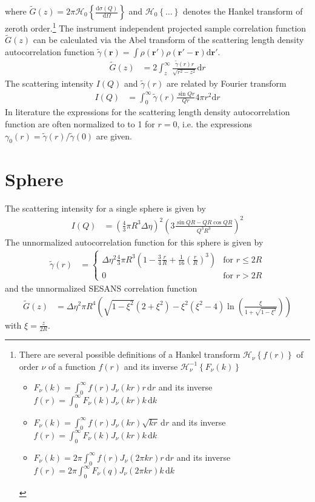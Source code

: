 where $\tilde{G}(z)=2\pi\mathcal{H}_0\left\{\frac{\mathrm{d}\sigma(Q)}{\mathrm{d}\Omega}\right\}$ and $\mathcal{H}_0\left\{\ldots\right\}$ denotes the Hankel transform of zeroth order.\footnote{
There are several possible definitions of a Hankel transform $\mathcal{H}_\nu\left\{f(r)\right\}$ of order $\nu$ of a function $f(r)$ and its inverse $\mathcal{H}_\nu^{-1}\left\{F_\nu(k)\right\}$
\begin{itemize}
\item $F_\nu(k) = \int_0^\infty f(r) J_\nu(kr) r \,\mathrm{d}r$ and its inverse $f(r)=\int_0^\infty F_\nu(k)J_\nu(kr) k \,\mathrm{d}k$
\item $F_\nu(k) = \int_0^\infty f(r) J_\nu(kr) \sqrt{kr} \,\mathrm{d}r$ and its inverse $f(r)=\int_0^\infty F_\nu(k)J_\nu(kr) k \, \mathrm{d}k$
\item $F_\nu(k) = 2\pi \int_0^\infty f(r) J_\nu(2\pi kr) r \,\mathrm{d}r$ and its inverse $f(r)=2\pi \int_0^\infty F_\nu(q)J_\nu(2\pi kr) k \,\mathrm{d}k$
\end{itemize}
}
The instrument independent projected sample correlation function $\tilde{G}(z)$ can be calculated via the Abel transform of the scattering length density autocorrelation function $\tilde{\gamma}(\mathbf{r})=\int \rho(\mathbf{r'})\rho(\mathbf{r'-r})\mathrm{d}\mathbf{r'}$.
\begin{align}
\tilde{G}(z) &= 2 \int_z^\infty \frac{\tilde{\gamma}(r) r}{\sqrt{r^2-z^2}} \mathrm{d}r
\end{align}
The scattering intensity $I(Q)$ and  $\tilde{\gamma}(r)$ are related by Fourier transform
\begin{align}
I(Q) &= \int_0^\infty \tilde{\gamma}(r) \frac{\sin Qr}{Qr}4\pi r^2\mathrm{d}r
\end{align}
In literature the expressions for the scattering length density autocorrelation function are often normalized to to 1 for $r=0$, i.e. the expressions $\gamma_0(r)=\tilde{\gamma}(r)/\tilde{\gamma}(0)$ are given.

\section{Sphere}
The scattering intensity for a single sphere is given by
\begin{align}
I(Q) &= \left(\frac{4}{3}\pi R^3 \Delta\eta\right)^2 \left(3\frac{\sin QR-QR\cos QR}{Q^3R^3}\right)^2
\end{align}
The unnormalized autocorrelation function for this sphere is given by
\begin{align}
\tilde{\gamma}(r) &=
\begin{cases}
 \Delta\eta^2  \frac{4}{3}\pi R^3 \left( 1-\frac{3}{4}\frac{r}{R}+\frac{1}{16}\left(\frac{r}{R}\right)^3\right) & \mbox{for } r\leq 2R \\
0 & \mbox{for }  r>2R
\end{cases}
\end{align}
and the unnormalized SESANS correlation function
\begin{align}
\tilde{G}(z)&= \Delta\eta^2 \pi R^4 \left(\sqrt{1-\xi^2}(2+\xi^2)-\xi^2(\xi^2-4)\ln\left(\frac{\xi}{1+\sqrt{1-\xi^2}}\right)\right)
\end{align}
with $\xi=\frac{z}{2R}$. 